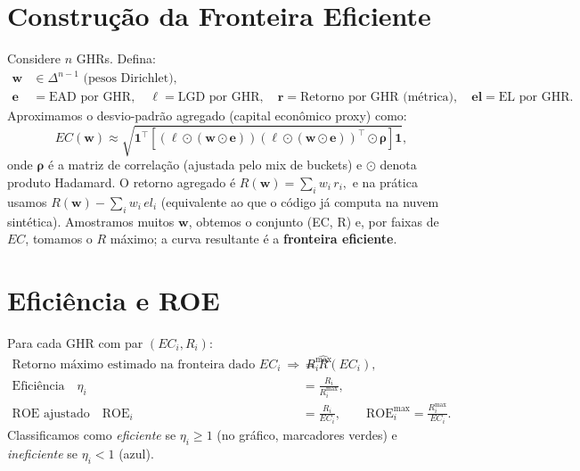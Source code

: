 \documentclass[11pt,a4paper]{article}
\newcommand{\1}{\mathbf{1}}
\newcommand{\vect}[1]{\bm{#1}}
\begin{document}
\section{Construção da Fronteira Eficiente}
Considere $n$ GHRs. Defina:
\begin{align}
\vect{w} &\in \Delta^{n-1} \text{ (pesos Dirichlet)}, \\
\vect{e} &= \text{EAD por GHR},\quad \bm{\ell}=\text{LGD por GHR},\quad
\bm{r} = \text{Retorno por GHR (métrica)},\quad \bm{el}=\text{EL por GHR}.
\end{align}
Aproximamos o desvio-padrão agregado (capital econômico proxy) como:
\begin{equation}
EC(\vect{w}) \approx \sqrt{\1^\top \left[ \left(\bm{\ell}\odot (\vect{w}\odot \vect{e})\right)\left(\bm{\ell}\odot (\vect{w}\odot \vect{e})\right)^\top \odot \bm{\rho}\right]\1},
\end{equation}
onde $\bm{\rho}$ é a matriz de correlação (ajustada pelo mix de buckets) e $\odot$ denota produto Hadamard. O retorno agregado é
\(
R(\vect{w}) = \sum_i w_i\, r_i,
\)
e na prática usamos $R(\vect{w}) - \sum_i w_i\, el_i$ (equivalente ao que o código já computa na nuvem sintética). Amostramos muitos $\vect{w}$, obtemos o conjunto (EC, R) e, por faixas de $EC$, tomamos o $R$ máximo; a curva resultante é a \textbf{fronteira eficiente}.

\section{Eficiência e ROE}
Para cada GHR com par $(EC_i, R_i)$:
\begin{align}
\text{Retorno máximo estimado na fronteira dado } EC_i \ \Rightarrow\ R_i^{\max} &= \widehat{R}(EC_i),\\
\text{Eficiência} \quad \eta_i &= \frac{R_i}{R_i^{\max}}, \\
\text{ROE ajustado} \quad \mathrm{ROE}_i &= \frac{R_i}{EC_i}, \qquad
\mathrm{ROE}_{i}^{\max} = \frac{R_i^{\max}}{EC_i}.
\end{align}
Classificamos como \emph{eficiente} se $\eta_i \ge 1$ (no gráfico, marcadores verdes) e \emph{ineficiente} se $\eta_i<1$ (azul).
\end{document}
